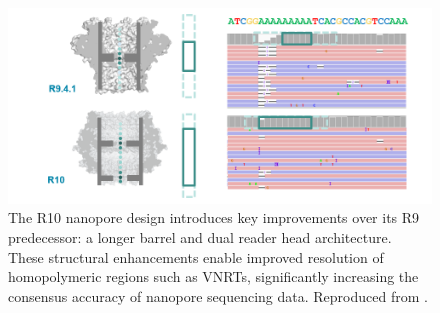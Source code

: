 \begin{figure}[H]
    \centering
    \includegraphics[width=\textwidth]{img/ont_pores.png}
    \caption[R10 nanopore improvements over R9]{The R10 nanopore design introduces 
    key improvements over its R9 predecessor: a longer barrel and dual reader head 
    architecture. These structural enhancements enable improved resolution of 
    homopolymeric regions such as VNRTs, significantly increasing the consensus 
    accuracy of nanopore sequencing data. Reproduced from 
    \cite{oxford_nanopore_technologies_r103_2020}.}
    \label{fig:ont_pores}
\end{figure}


